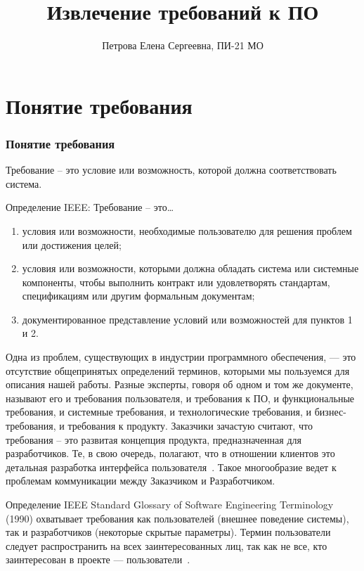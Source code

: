 \documentclass{../industrial-development}
\title{Извлечение требований к ПО}
\author{Петрова Елена Сергеевна, ПИ-21 МО}
\date{}
\begin{document}
\begin{frame}
  \titlepage
\end{frame}

\section{Понятие требования}
\begin{frame} \frametitle{Понятие требования}
  \begin{block}{}
   \alert{Требование} – это условие или возможность, которой должна соответствовать система.
  \end{block}
  Определение IEEE:  \alert{Требование} – это\dots
	 \begin{enumerate}
\item условия или возможности, необходимые пользователю для решения проблем или достижения целей;
\item условия или возможности, которыми должна обладать система или системные компоненты, чтобы выполнить контракт или
удовлетворять стандартам, спецификациям или другим формальным документам;
\item документированное представление условий или возможностей для пунктов 1 и 2.
  \end{enumerate}
\end{frame}

\lecturenotes

Одна из проблем, существующих в индустрии программного обеспечения, — это отсутствие общепринятых определений терминов, которыми мы пользуемся для описания нашей работы. Разные эксперты, говоря об одном и том же документе, называют его и требования пользователя, и требования к ПО, и функциональные требования, и системные требования, и технологические требования, и бизнес-требования, и требования к продукту. Заказчики зачастую считают, что требования -- это развитая концепция продукта, предназначенная для
разработчиков. Те, в свою очередь, полагают, что в отношении клиентов это детальная разработка интерфейса пользователя~\cite[с.~6]{Wiegers}. Такое многообразие ведет к проблемам коммуникации между Заказчиком и Разработчиком.

Определение IEEE Standard Glossary
of Software Engineering Terminology (1990) охватывает требования как пользователей (внешнее поведение системы), так и разработчиков (некоторые скрытые параметры). Термин пользователи следует распространить на всех заинтересованных лиц, так как не все, кто заинтересован в проекте — пользователи~\cite[с.~7]{Wiegers}. 
\end{document}
